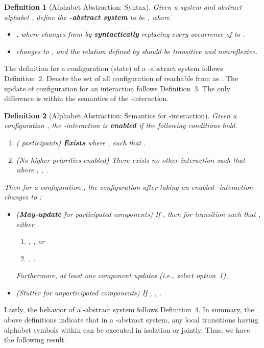 \documentclass[10pt, a4paper, onecolumn, conference, compsocconf]{IEEEtran}
\newtheorem{defi}{Definition}
\begin{document}
\begin{defi}[Alphabet Abstraction: Syntax]
Given a system  and abstract alphabet , define the \textbf{-abstract system}   to be , where
\begin{itemize}
    \item , where  changes from  by \textbf{syntactically} replacing every occurrence of  to .
    \item  changes to , and the relation defined by  should be transitive and nonreflexive.
\end{itemize}
\end{defi}

The definition for a configuration (state) of a -abstract system follows Definition~2.
Denote the set of all configuration of  reachable from  as .
The update of configuration for an interaction  follows Definition~3.
The only difference is within the semantics of the -interaction.

\begin{defi}[Alphabet Abstraction: Semantics for -interaction]\label{def:sharp.semantics}
Given a configuration , the -interaction is \textbf{enabled} if the following conditions hold.
\begin{enumerate}
    \item ( participants) \textbf{Exists}  where ,  such that .
    \item (No higher priorities enabled) There exists no other interaction  such that  where , , .
\end{enumerate}
Then for a configuration , the configuration after taking an enabled -interaction changes to
:
\begin{itemize}
    \item (\textbf{May-update} for participated components) If , then for transition  such that , either
        \begin{enumerate}
        \item , , or
        \item , .
        \end{enumerate}
        Furthermore, at least one component updates (i.e., select option~1).
    \item (Stutter for unparticipated components) If , , .
\end{itemize}
\end{defi}

\noindent Lastly, the behavior of a -abstract system follows Definition~4. In summary, the above definitions indicate that in a -abstract system, any local transitions having alphabet symbols within  can be executed in isolation or jointly. Thus, we have the following result.
\end{document}
